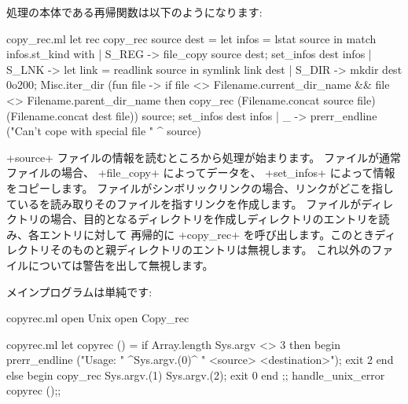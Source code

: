処理の本体である再帰関数は以下のようになります:
\begin{listingcodefile}{copy_rec.ml}
let rec copy_rec source dest =
  let infos = lstat source in
  match infos.st_kind with
  | S_REG ->
      file_copy source dest;
      set_infos dest infos
  | S_LNK ->
      let link = readlink source in
      symlink link dest
  | S_DIR ->
      mkdir dest 0o200;
      Misc.iter_dir
        (fun file ->
          if file <> Filename.current_dir_name
              && file <> Filename.parent_dir_name
          then
            copy_rec
              (Filename.concat source file)
              (Filename.concat dest file))
        source;
      set_infos dest infos
  | _ ->
      prerr_endline ("Can't cope with special file " ^ source)
\end{listingcodefile}
%
\ml+source+ ファイルの情報を読むところから処理が始まります。
ファイルが通常ファイルの場合、 \ml+file_copy+ によってデータを、 \ml+set_infos+ によって情報をコピーします。
ファイルがシンボリックリンクの場合、リンクがどこを指しているを読み取りそのファイルを指すリンクを作成します。
ファイルがディレクトリの場合、目的となるディレクトリを作成しディレクトリのエントリを読み、各エントリに対して
再帰的に \ml+copy\_rec+ を呼び出します。このときディレクトリそのものと親ディレクトリのエントリは無視します。
これ以外のファイルについては警告を出して無視します。

メインプログラムは単純です:
%
\begin{codefile}{copyrec.ml}
open Unix
open Copy_rec
\end{codefile}
%
\begin{listingcodefile}{copyrec.ml}
let copyrec () =
  if Array.length Sys.argv <> 3 then begin
    prerr_endline ("Usage: " ^Sys.argv.(0)^ " <source> <destination>");
    exit 2
  end else begin
    copy_rec Sys.argv.(1) Sys.argv.(2);
    exit 0
  end
;;
handle_unix_error copyrec ();;
\end{listingcodefile}

